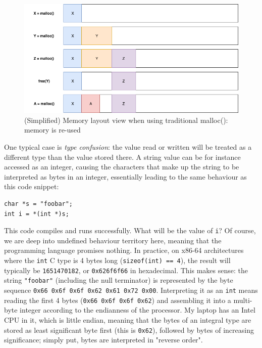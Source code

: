 \begin{figure}
	\centering
	\includegraphics[width=\textwidth]{img/normal_malloc.png}
	\caption{(Simplified) Memory layout view when using traditional malloc(): memory is re-used}
	\label{fig:normal_malloc}
\end{figure}

One typical case is \emph{type confusion}: the value read or written will be treated as a different type than the value stored there. A string value can be for instance accessed as an integer, causing the characters that make up the string to be interpreted as bytes in an integer, essentially leading to the same behaviour as this code snippet:

\begin{lstlisting}
char *s = "foobar";
int i = *(int *)s;
\end{lstlisting}

This code compiles and runs successfully. What will be the value of \lstinline!i!? Of course, we are deep into undefined behaviour territory here, meaning that the programming language promises nothing. In practice, on x86-64 architectures where the \lstinline!int! C type is 4 bytes long (\lstinline!sizeof(int) == 4!), the result will typically be \texttt{1651470182}, or \texttt{0x626f6f66} in hexadecimal. This makes sense: the string \lstinline!"foobar"! (including the null terminator) is represented by the byte sequence \texttt{0x66 0x6f 0x6f 0x62 0x61 0x72 0x00}. Interpreting it as an \lstinline!int! means reading the first 4 bytes (\texttt{0x66 0x6f 0x6f 0x62}) and assembling it into a multi-byte integer according to the endianness of the processor. My laptop has an Intel CPU in it, which is little endian, meaning that the bytes of an integral type are stored as least significant byte first (this is \texttt{0x62}), followed by bytes of increasing significance; simply put, bytes are interpreted in "reverse order".

